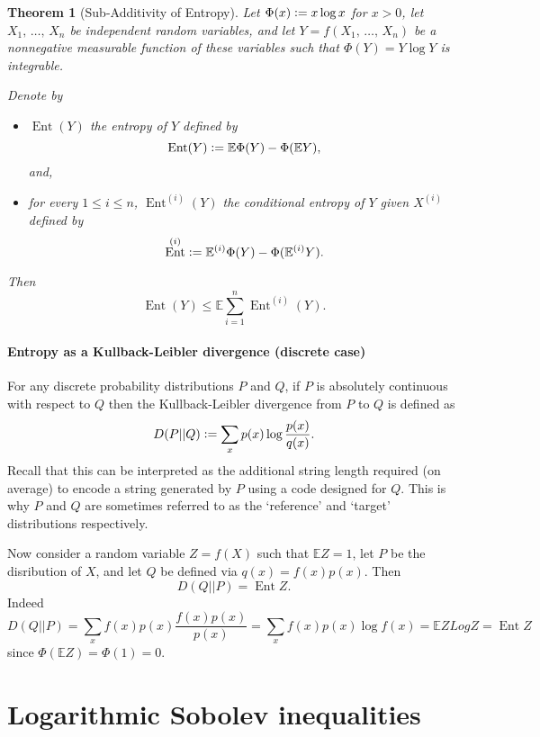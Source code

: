 \documentclass[reqno]{amsproc}
\newtheorem{theorem}{Theorem}
\newcommand{\defeq}{\vcentcolon=} %
\newcommand{\E}{\mathbb{E}} %
\DeclareMathOperator{\Ent}{Ent} %
\begin{document}
\begin{theorem}[Sub-Additivity of Entropy]
\label{thm:sub_add_entropy}
	Let $\Phi(x) \defeq x\log x$ for $x>0$, let $X_1,\,\dots,\,X_n$ be independent random variables, and
	let $Y = f(X_1,\,\dots,\,X_n)$ be a nonnegative measurable function of these variables such that $\Phi(Y) = Y\log Y$ is integrable.

	Denote by 
	\begin{itemize}
		\item	$\Ent (Y)$ the \emph{entropy} of $Y$ defined by $$\Ent (Y) \defeq \E\Phi (Y) - \Phi(\E Y),$$ and,
		\item	for every $1\leq i \leq n$, $\Ent^{(i)} (Y)$ the \emph{conditional entropy} of $Y$ given $X^{(i)}$
			defined by $$\Ent^{(i)} \defeq \E^{(i)}\Phi (Y) - \Phi(\E^{(i)} Y).$$
	\end{itemize}

	Then $$\Ent (Y) \leq \E \sum_{i=1}^n \Ent^{(i)} (Y).$$
\end{theorem}

\paragraph{\textbf{Entropy as a Kullback-Leibler divergence (discrete case)}}
\label{rmk:entropy_as_KL_divergence}
	For any discrete probability distributions $P$ and $Q$, if $P$ is absolutely continuous with respect to $Q$ then the Kullback-Leibler divergence from $P$ to $Q$ is defined as
	$$D(P||Q) \defeq \sum_x p(x) \log \frac{p(x)}{q(x)}.$$
	Recall that this can be interpreted as the additional string length required (on average) to encode a string generated by $P$ using a code designed for $Q$.
	This is why $P$ and $Q$ are sometimes referred to as the `reference' and `target' distributions respectively.

	Now consider a random variable $Z=f(X)$ such that $\E Z=1$, let $P$ be the disribution of $X$, and let $Q$ be defined via $q(x) = f(x) p(x)$.
	Then $$D(Q||P) = \Ent Z.$$
	Indeed $$D(Q||P) = \sum_x f(x) p(x) \frac{f(x) p(x)}{p(x)} = \sum_x f(x) p(x) \log f(x) = \E Z Log Z = \Ent Z$$
	since $\Phi(\E Z) = \Phi(1) = 0$.


\section{Logarithmic Sobolev inequalities}
\label{sec:log_Sob_ineq}
\end{document}
